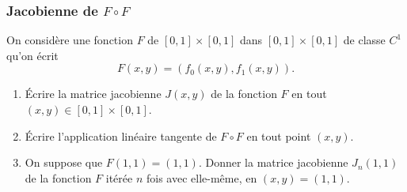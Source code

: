 \subsubsection{Jacobienne de $F \circ F$}

On considère une fonction $F$ de $[0, 1] \times [0, 1]$ dans $[0, 1] \times [0, 1]$ de classe $C^1$ qu'on écrit
$$
F(x, y) = (f_0(x, y), f_1(x, y)).
$$
\begin{enumerate}
  \item \'Ecrire la matrice jacobienne $J(x, y)$ de la fonction $F$ en tout $(x, y) \in [0, 1] \times [0, 1]$.
  \solution{\todo{}}
  \item \'Ecrire l'application linéaire tangente de $F \circ F$ en tout point $(x, y)$.
  \solution{\todo{}}
  \item On suppose que $F(1, 1) = (1, 1)$. Donner la matrice jacobienne $J_n(1, 1)$ de la fonction $F$ itérée $n$ fois avec elle-même, en $(x, y) = (1, 1)$.
  \solution{\todo{}}
\end{enumerate}

